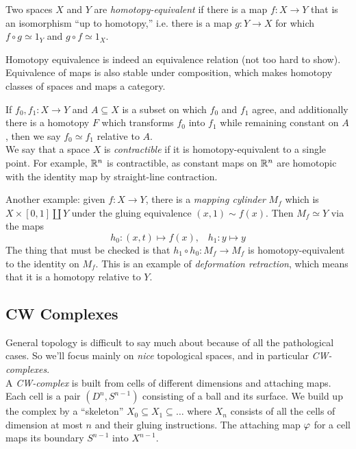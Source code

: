 \documentclass{amsart}
\begin{document}
	Two spaces $X$ and $Y$ are \textit{homotopy-equivalent} if there is a map $f:X\to Y$ that is an isomorphism ``up to homotopy,'' i.e. there is a map $g:Y\to X$ for which $f\circ g \simeq 1_Y$ and $g\circ f \simeq 1_X$. 
	
	Homotopy equivalence is indeed an equivalence relation (not too hard to show). Equivalence of maps is also stable under composition, which makes homotopy classes of spaces and maps a category.
	
	If $f_0,f_1:X\to Y$ and $A\subseteq X$ is a subset on which $f_0$ and $f_1$ agree, and additionally there is a homotopy $F$ which transforms $f_0$ into $f_1$ while remaining constant on $A$, then we say $f_0\simeq f_1$ relative to $A$. \\
	
	We say that a space $X$ is \textit{contractible} if it is homotopy-equivalent to a single point. For example, $\mathbb{R}^n$ is contractible, as constant maps on $\mathbb{R}^n$ are homotopic with the identity map by straight-line contraction. 
	
	Another example: given $f:X\to Y$, there is a \textit{mapping cylinder} $M_f$ which is $X\times [0,1] \coprod Y$ under the gluing equivalence $(x,1)\sim f(x)$. Then $M_f\simeq Y$ via the maps
	$$
	h_0: (x,t) \mapsto f(x), \;\;\; h_1 : y \mapsto y
	$$
	The thing that must be checked is that $h_1\circ h_0:M_f\to M_f$ is homotopy-equivalent to the identity on $M_f$. This is an example of \textit{deformation retraction}, which means that it is a homotopy relative to $Y$.\\
	
	\subsection{CW Complexes}
	
	General topology is difficult to say much about because of all the pathological cases. So we'll focus mainly on \textit{nice} topological spaces, and in particular \textit{CW-complexes}.\\
	
	A \textit{CW-complex} is built from cells of different dimensions and attaching maps. Each cell is a pair $(D^n,S^{n-1})$ consisting of a ball and its surface. We build up the complex by a ``skeleton'' $X_0\subseteq X_1\subseteq \dots$ where $X_n$ consists of all the cells of dimension at most $n$ and their gluing instructions. The attaching map $\varphi$ for a cell maps its boundary $S^{n-1}$ into $X^{n-1}$. 
	
\end{document}
